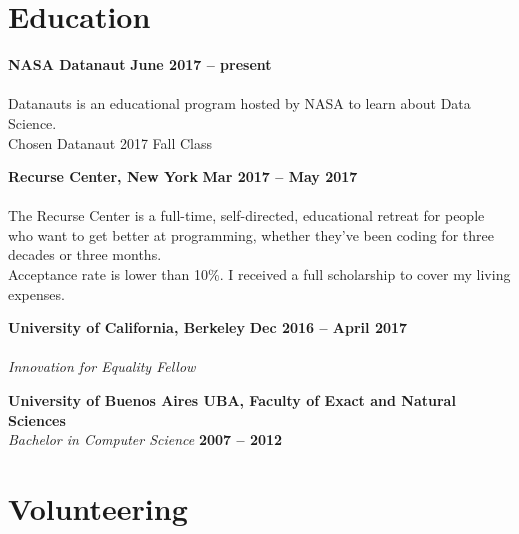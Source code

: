 \documentclass[margin,line]{resume}
\begin{document}
\begin{resume}
\newpage

\section{\mysidestyle Education}


\textbf{NASA Datanaut} \hfill \textbf{June 2017 -- present}\vspace{-3mm}\\\vspace{-1mm}
\\
Datanauts is an educational program hosted by NASA to learn about Data Science.
\\
Chosen Datanaut 2017 Fall Class



\textbf{Recurse Center, New York} \hfill \textbf{Mar 2017 -- May 2017}\vspace{-3mm}\\\vspace{-1mm}
\\
The Recurse Center is a full-time, self-directed, educational retreat for people who want to get better at programming, whether they've been coding for three decades or three months.  \\
Acceptance rate is lower than 10\%. I received a full scholarship to cover my living expenses.


\textbf{University of California, Berkeley} \hfill \textbf{Dec 2016 -- April 2017}\vspace{-3mm}\\\vspace{-1mm}
\\
\textsl{Innovation for Equality Fellow} 


\textbf{University of Buenos Aires UBA, Faculty of Exact and Natural Sciences} \vspace{2mm}\\\vspace{1mm}
\textsl{Bachelor in Computer Science} \hfill \textbf{2007 -- 2012}\vspace{-3mm}\\\vspace{-1mm}


\section{\mysidestyle Volunteering}




\end{resume}
\end{document}
